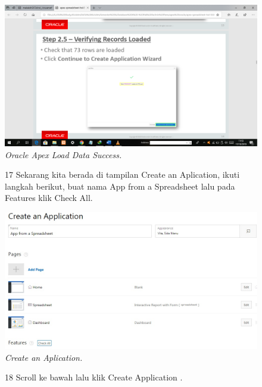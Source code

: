 \begin{enumerate}
\begin{figure}
    \begin{center}
\includegraphics[scale=0.2]{figures/pict(12).png}
    \caption{\textit{Oracle Apex Load Data Success.}}
        \end{center}
\label{gambar}
\end{figure}

\begin{figure}
\item[17] Sekarang kita berada di tampilan Create an Aplication, ikuti langkah berikut, buat nama App from a Spreadsheet lalu pada Features klik Check All.

    \begin{center}
\includegraphics[scale=0.4]{figures/create1.jpg}
    \caption{\textit{Create an Aplication.}}
        \end{center}
\label{gambar}
\end{figure}


\begin{figure}
\item[18]Scroll ke bawah lalu klik Create Application .


\end{figure}
\end{enumerate}
